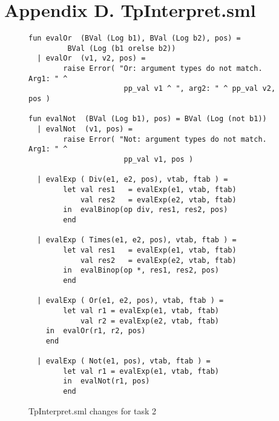 \documentclass[12pt,a4paper,english]{article}
\begin{document}
\section{Appendix D. TpInterpret.sml}
\begin{figure}[h]
\begin{lstlisting}
fun evalOr  (BVal (Log b1), BVal (Log b2), pos) = 
	     BVal (Log (b1 orelse b2))
  | evalOr  (v1, v2, pos) =
        raise Error( "Or: argument types do not match. Arg1: " ^
                      pp_val v1 ^ ", arg2: " ^ pp_val v2, pos )
                      
fun evalNot  (BVal (Log b1), pos) = BVal (Log (not b1))
  | evalNot  (v1, pos) =
        raise Error( "Not: argument types do not match. Arg1: " ^
                      pp_val v1, pos )

  | evalExp ( Div(e1, e2, pos), vtab, ftab ) =
        let val res1   = evalExp(e1, vtab, ftab)
            val res2   = evalExp(e2, vtab, ftab)
        in  evalBinop(op div, res1, res2, pos)
        end

  | evalExp ( Times(e1, e2, pos), vtab, ftab ) =
        let val res1   = evalExp(e1, vtab, ftab)
            val res2   = evalExp(e2, vtab, ftab)
        in  evalBinop(op *, res1, res2, pos)
        end

  | evalExp ( Or(e1, e2, pos), vtab, ftab ) =
        let val r1 = evalExp(e1, vtab, ftab)
            val r2 = evalExp(e2, vtab, ftab)
  	in  evalOr(r1, r2, pos)
  	end
    
  | evalExp ( Not(e1, pos), vtab, ftab ) =
        let val r1 = evalExp(e1, vtab, ftab)
        in  evalNot(r1, pos)
        end
\end{lstlisting}
\caption{TpInterpret.sml changes for task 2}\end{figure}
\end{document}
